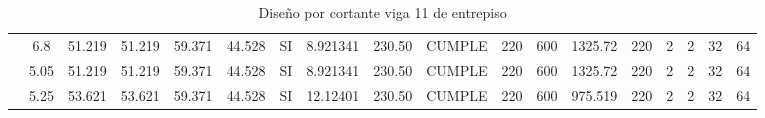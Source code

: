 \begin{table}[H]
{\begin{tabular}{|c|c|c|c|c|c|c|c|c|c|c|c|c|c|c|c|c|c|}
\cline{2-18}          & 6.8   & 51.219 & 51.219 & 59.371 & 44.528 & SI    & 8.921341 & 230.50 & CUMPLE & 220   & 600   & 1325.72 & 220   & 2     & 2     & 32    & 64 \bigstrut\\
\cline{2-18}          & 5.05  & 51.219 & 51.219 & 59.371 & 44.528 & SI    & 8.921341 & 230.50 & CUMPLE & 220   & 600   & 1325.72 & 220   & 2     & 2     & 32    & 64 \bigstrut\\
\cline{2-18}          & 5.25  & 53.621 & 53.621 & 59.371 & 44.528 & SI    & 12.12401 & 230.50 & CUMPLE & 220   & 600   & 975.519 & 220   & 2     & 2     & 32    & 64 \bigstrut\\
    \hline
    \end{tabular}}%
  \caption{Diseño por cortante viga 11 de entrepiso}
  \label{tab:Cort V11E}%
\end{table}%
